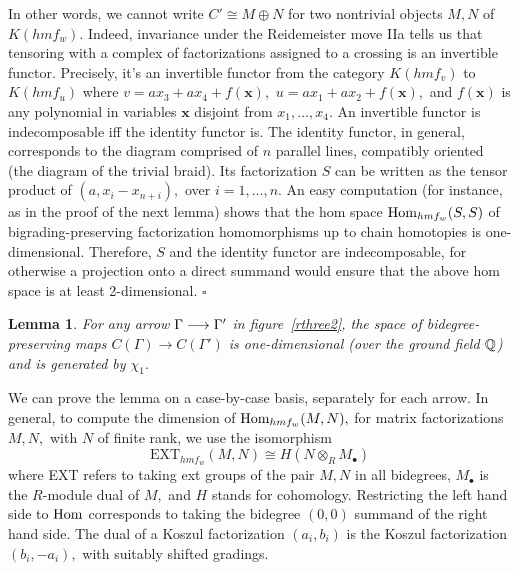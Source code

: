 \documentclass[12pt]{article}
\newtheorem{lemma}{Lemma}
\begin{document}
In other words, we cannot write $C'\cong M\oplus N$ for two nontrivial 
objects $M,N$ of $K(hmf_w).$ Indeed, invariance under the Reidemeister 
move IIa tells us that tensoring with a complex of factorizations assigned 
to a crossing is an invertible functor. Precisely, it's an invertible 
functor from the category $K(hmf_v)$ to $K(hmf_u)$ where 
$v=ax_3+ax_4+f(\mathbf{x}),$ 
 $u=ax_1+ax_2 + f(\mathbf{x}),$ and $f(\mathbf{x})$ is  any polynomial 
in variables $\mathbf{x}$ disjoint from $x_1, \dots, x_4.$ An invertible 
functor is indecomposable iff the identity functor is. 
The identity functor, in general, corresponds 
to the diagram comprised of $n$ parallel lines, compatibly
oriented (the diagram of the trivial braid). Its factorization $S$  
can be written as the tensor product of 
$(a, x_i -x_{n+i}), $ over $i=1, \dots, n.$ An easy computation 
(for instance, as in the proof of the next lemma) 
shows that the hom space $\mathrm{Hom}_{hmf_w}(S,S)$ of bigrading-preserving 
factorization homomorphisms up to chain homotopies is one-dimensional. 
Therefore, $S$ and the identity functor are indecomposable, for 
otherwise a projection onto a direct summand would ensure that the above 
hom space is at least 2-dimensional. $\square$ 


\begin{lemma} \label{space-one-dim} 
For any arrow $\Gamma\longrightarrow \Gamma'$ in figure~\ref{rthree2}, the space 
of bidegree-preserving maps $C(\Gamma) \to C(\Gamma')$ is 
one-dimensional (over the ground field $\mathbb Q$) and is generated by $\chi_1.$ 
\end{lemma}

We can prove the lemma on a case-by-case basis, separately for each arrow. 
In general, to compute the dimension of $\mathrm{Hom}_{hmf_w}(M,N),$ for matrix 
factorizations $M,N,$ with $N$ of finite rank, we use the isomorphism 
$$ \mathrm{EXT}_{hmf_w}(M,N) \cong H(N \otimes_R M_{\bullet})$$ 
where EXT refers to taking ext groups of the pair $M,N$ in all bidegrees, 
$M_{\bullet}$ is the $R$-module dual of $M,$ and $H$ stands for cohomology. 
Restricting the left hand side to $\mathrm{Hom}$ corresponds to taking the bidegree 
$(0,0)$ summand of the right hand side. The dual of a Koszul factorization 
$(a_i, b_i)$ is the Koszul factorization $(b_i, -a_i),$ with suitably 
shifted gradings. 
\end{document}
